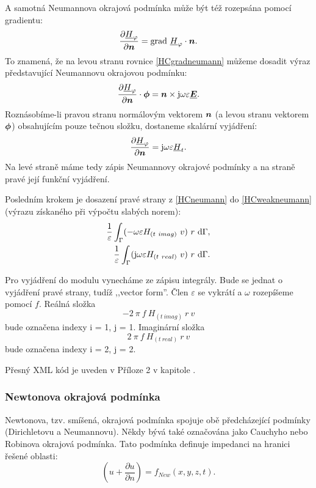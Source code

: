 \documentclass[12pt,a4paper,oneside]{article}
\numberwithin{equation}{section} %
\numberwithin{figure}{section} %
\numberwithin{table}{section} %
\newcommand{\mj}{\mathrm{j}} %
\renewcommand{\vec}[1]{\mbox{\boldmath$#1$}} %
\newcommand{\faz}[1]{{\underline{#1}}} %
\newcommand{\grad}{\mathrm{grad}\ }
\begin{document}
A samotná Neumannova okrajová podmínka může být též rozepsána pomocí gradientu:
\begin{equation}
\label{HCgradneumann}
\frac{\partial \faz{H} _{\varphi}}{\partial \vec{n}} = \grad \faz{H} _{\varphi} \cdot \vec{n} .
\end{equation}
To znamená, že na levou stranu rovnice \ref{HCgradneumann} můžeme dosadit výraz představující Neumannovu okrajovou podmínku:
\begin{equation}
\label{NeumannHCvek}
\frac{\partial \faz{H}_{\varphi}}{\partial \vec{n}} \cdot \vec{\phi} = \vec{n} \times \mj \omega \varepsilon \faz{\vec{E}} .
\end{equation}
Roznásobíme-li pravou stranu normálovým vektorem $\vec{n}$ (a levou stranu vektorem $\vec{\phi}$) obsahujícím pouze tečnou složku, dostaneme skalární vyjádření:
\begin{equation}
\label{HCneumann}
\frac{\partial \faz{H} _{\varphi}}{\partial \vec{n}} = \mj \omega \varepsilon \faz{H} _t .
\end{equation}
Na levé straně máme tedy zápis Neumannovy okrajové podmínky a na straně pravé její funkční vyjádření.

Posledním krokem je dosazení pravé strany z \ref{HCneumann} do \ref{HCweakneumann} (výrazu získaného při výpočtu slabých norem):
\begin{subequations}
\begin{align}
\frac{1}{\varepsilon} \int _{\Gamma} (- \omega \varepsilon H_{(t~imag)} ~ v ) ~ r ~ \ud \Gamma ,
\\ 
\frac{1}{\varepsilon} \int _{\Gamma} ( \mj \omega \varepsilon H_{(t~real)} ~ v ) ~ r ~ \ud \Gamma .
\end{align}
\end{subequations}

Pro vyjádření do modulu vynecháme ze zápisu integrály. Bude se jednat o vyjádření pravé strany, tudíž ,,vector form''. Člen $\varepsilon$ se vykrátí a $\omega$ rozepíšeme pomocí $f$. Reálná složka 
\begin{equation}
- 2 ~ \pi ~ f ~ H_{(t~imag)} ~ r ~ v
\end{equation} 
bude označena indexy i = 1, j = 1. Imaginární složka 
\begin{equation}
2 ~ \pi ~ f ~ H_{(t~real)} ~ r ~ v
\end{equation}
bude označena indexy i = 2, j = 2.

Přesný XML kód je uveden v Příloze 2 v kapitole .


\subsubsection{Newtonova okrajová podmínka}
Newtonova, tzv. smíšená, okrajová podmínka spojuje obě předcházející podmínky (Dirichletovu a Neumannovu). Někdy bývá také označována jako Cauchyho nebo Robinova okrajová podmínka. Tato podmínka definuje impedanci na hranici řešené oblasti:
\begin{equation}
\label{Newton}
\left( u + \frac{\partial u}{\partial n} \right) = f _{New} (x, y, z, t) .
\end{equation}  
\end{document}
